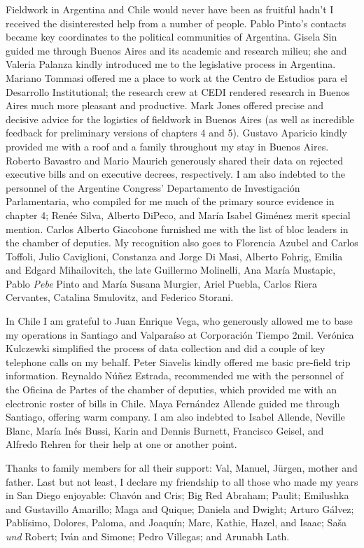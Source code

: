 Fieldwork in Argentina and Chile would never have been as fruitful hadn't I received the disinterested help from a number of people.  Pablo Pinto's contacts became key coordinates to the political communities of Argentina.  Gisela Sin guided me through Buenos Aires and its academic and research milieu; she and Valeria Palanza kindly introduced me to the legislative process in Argentina.  Mariano Tommasi offered me a place to work at the Centro de Estudios para el Desarrollo Institutional; the research crew at CEDI rendered research in Buenos Aires much more pleasant and productive.  Mark Jones offered precise and decisive advice for the logistics of fieldwork in Buenos Aires (as well as incredible feedback for preliminary versions of chapters 4 and 5).  Gustavo Aparicio kindly provided me with a roof and a family throughout my stay in Buenos Aires.  Roberto Bavastro and Mario Maurich generously shared their data on rejected executive bills and on executive decrees, respectively.  I am also indebted to the personnel of the Argentine Congress' Departamento de Investigación Parlamentaria, who compiled for me much of the primary source evidence in chapter 4; Renée Silva, Alberto DiPeco, and María Isabel Giménez merit special mention.  Carlos Alberto Giacobone furnished me with the list of bloc leaders in the chamber of deputies.  My recognition also goes to Florencia Azubel and Carlos Toffoli, Julio Caviglioni, Constanza and Jorge Di Masi, Alberto Fohrig, Emilia and Edgard Mihailovitch, the late Guillermo Molinelli, Ana María Mustapic, Pablo \emph{Pebe} Pinto and María Susana Murgier, Ariel Puebla, Carlos Riera Cervantes, Catalina Smulovitz, and Federico Storani. 

In Chile I am grateful to Juan Enrique Vega, who generously allowed me to base my operations in Santiago and Valparaíso at Corporación Tiempo 2mil.  Verónica Kulczewki simplified the process of data collection and did a couple of key telephone calls on my behalf.  Peter Siavelis kindly offered me basic pre-field trip information.  Reynaldo Núñez Estrada, recommended me with the personnel of the Oficina de Partes of the chamber of deputies, which provided me with an electronic roster of bills in Chile.  Maya Fernández Allende guided me through Santiago, offering warm company.  I am also indebted to Isabel Allende, Neville Blanc, María Inés Bussi, Karin and Dennis Burnett, Francisco Geisel, and Alfredo Rehren for their help at one or another point.  

Thanks to family members for all their support: Val, Manuel, Jürgen, mother and father.  Last but not least, I declare my friendship to all those who made my years in San Diego enjoyable: Chavón and Cris; Big Red Abraham; Paulit; Emilushka and Gustavillo Amarillo; Maga and Quique; Daniela and Dwight; Arturo Gálvez; Pablísimo, Dolores, Paloma, and Joaquín; Marc, Kathie, Hazel, and Isaac; Sa\v{s}a \emph{und} Robert; Iván and Simone; Pedro Villegas; and Arunabh Lath. 

